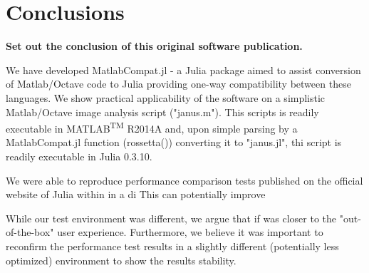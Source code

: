 \section{Conclusions}
\label{} 

\textbf{Set out the conclusion of this original software publication.}

We have developed MatlabCompat.jl - a Julia package aimed to assist conversion of Matlab/Octave code to Julia providing one-way compatibility between these languages. We show practical applicability of the software on a simplistic Matlab/Octave image analysis script ("janus.m"). This scripts is readily executable in MATLAB\textsuperscript{TM} R2014A and, upon simple parsing by a MatlabCompat.jl function (rossetta()) converting it to "janus.jl", thi script is readily executable in Julia 0.3.10.

We were able to reproduce performance comparison tests published on the official website of Julia within in a di This can potentially improve 

While our test environment was different, we argue that if was closer to the "out-of-the-box" user experience. Furthermore, we believe it was important to reconfirm the performance test results in a slightly different (potentially less optimized) environment to show the results stability.

  
  
  